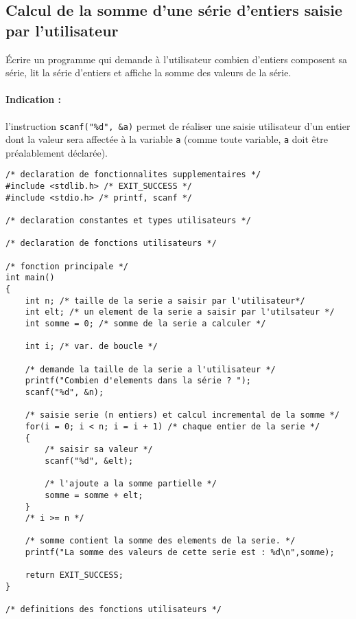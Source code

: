 \subsection{Calcul de la somme d'une série d'entiers saisie par l'utilisateur}

Écrire un programme qui demande à l'utilisateur combien d'entiers
composent sa série, lit la série d'entiers et affiche la somme des
valeurs de la série. 

\paragraph{Indication :} l'instruction 
\verb+scanf("%d", &a)+
permet de réaliser une saisie utilisateur d'un entier dont la valeur
sera affectée à la variable \texttt{a} (comme toute variable, \texttt{a} doit
être préalablement déclarée).

\begin{correction}
\begin{verbatim}
/* declaration de fonctionnalites supplementaires */
#include <stdlib.h> /* EXIT_SUCCESS */
#include <stdio.h> /* printf, scanf */

/* declaration constantes et types utilisateurs */

/* declaration de fonctions utilisateurs */

/* fonction principale */
int main()
{
    int n; /* taille de la serie a saisir par l'utilisateur*/
    int elt; /* un element de la serie a saisir par l'utilsateur */
    int somme = 0; /* somme de la serie a calculer */

    int i; /* var. de boucle */

    /* demande la taille de la serie a l'utilisateur */
    printf("Combien d'elements dans la série ? ");
    scanf("%d", &n);

    /* saisie serie (n entiers) et calcul incremental de la somme */
    for(i = 0; i < n; i = i + 1) /* chaque entier de la serie */
    {
        /* saisir sa valeur */
        scanf("%d", &elt);

        /* l'ajoute a la somme partielle */
        somme = somme + elt;
    }
    /* i >= n */

    /* somme contient la somme des elements de la serie. */
    printf("La somme des valeurs de cette serie est : %d\n",somme);

    return EXIT_SUCCESS;
}

/* definitions des fonctions utilisateurs */
\end{verbatim}
\end{correction}


